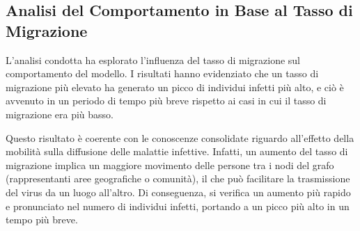 \subsection{Analisi del Comportamento in Base al Tasso di Migrazione}

L'analisi condotta ha esplorato l'influenza del tasso di migrazione sul 
comportamento del modello. I risultati hanno evidenziato che un tasso di 
migrazione più elevato ha generato un picco di individui infetti più alto, 
e ciò è avvenuto in un periodo di tempo più breve rispetto ai casi in cui 
il tasso di migrazione era più basso.

Questo risultato è coerente con le conoscenze consolidate riguardo 
all'effetto della mobilità sulla diffusione delle malattie infettive. 
Infatti, un aumento del tasso di migrazione implica un maggiore movimento 
delle persone tra i nodi del grafo (rappresentanti aree geografiche o 
comunità), il che può facilitare la trasmissione del virus da un luogo 
all'altro. Di conseguenza, si verifica un aumento più rapido e 
pronunciato nel numero di individui infetti, portando a un picco più 
alto in un tempo più breve.

